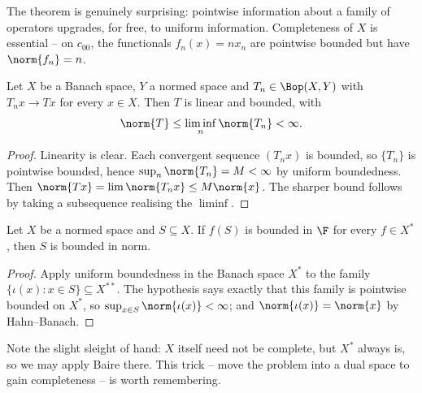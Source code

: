 The theorem is genuinely surprising: pointwise information about a family of operators upgrades, for free, to uniform information. Completeness of $X$ is essential -- on $c_{00}$, the functionals $f_n(x) = n x_n$ are pointwise bounded but have $\norm{f_n} = n$.

\begin{corollary}
	Let $X$ be a Banach space, $Y$ a normed space and $T_n \in \Bop(X,Y)$ with $T_n x \to Tx$ for every $x \in X$. Then $T$ is linear and bounded, with
	$$\norm{T} \leq \liminf_{n} \norm{T_n} < \infty.$$
\end{corollary}

\begin{proof}
	Linearity is clear. Each convergent sequence $(T_nx)$ is bounded, so $\{T_n\}$ is pointwise bounded, hence $\sup_n \norm{T_n} = M < \infty$ by uniform boundedness. Then $\norm{Tx} = \lim \norm{T_nx} \leq M\norm{x}$. The sharper bound follows by taking a subsequence realising the $\liminf$.
\end{proof}

\begin{corollary}
	Let $X$ be a normed space and $S \subseteq X$. If $f(S)$ is bounded in $\F$ for every $f \in X^*$, then $S$ is bounded in norm.
\end{corollary}

\begin{proof}
	Apply uniform boundedness in the Banach space $X^*$ to the family $\{\iota(x) : x \in S\} \subseteq X^{**}$. The hypothesis says exactly that this family is pointwise bounded on $X^*$, so $\sup_{x \in S}\norm{\iota(x)} < \infty$; and $\norm{\iota(x)} = \norm{x}$ by Hahn--Banach.
\end{proof}

Note the slight sleight of hand: $X$ itself need not be complete, but $X^*$ always is, so we may apply Baire there. This trick -- move the problem into a dual space to gain completeness -- is worth remembering.

